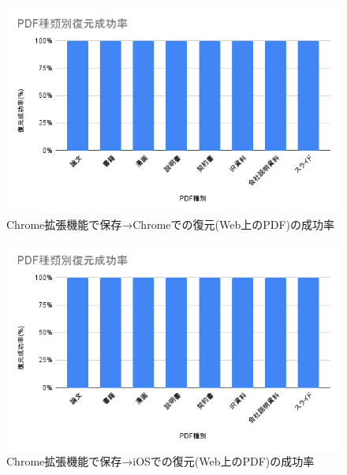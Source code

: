 \begin{figure}[htbp]
  \caption{Chrome拡張機能で保存→Chromeでの復元(Web上のPDF)の成功率}
  \label{fig:chrome-chrome-success-rate-pdf}
  \begin{center}
    \includegraphics[bb=0 0 600 371,width=15cm]{img/060_evaluation/success-rate-pdf.pdf}
  \end{center}
\end{figure}

\begin{figure}[htbp]
  \caption{Chrome拡張機能で保存→iOSでの復元(Web上のPDF)の成功率}
  \label{fig:chrome-ios-local-success-rate-pdf}
  \begin{center}
    \includegraphics[bb=0 0 600 371,width=15cm]{img/060_evaluation/success-rate-pdf.pdf}
  \end{center}
\end{figure}
